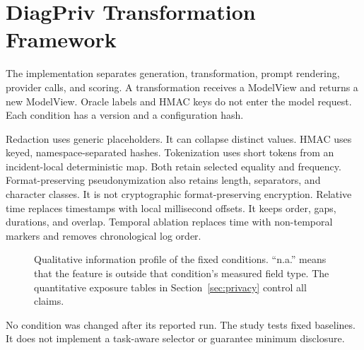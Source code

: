 \section{DiagPriv Transformation Framework}
\label{sec:framework}
The implementation separates generation, transformation, prompt rendering,
provider calls, and scoring. A transformation receives a ModelView and returns
a new ModelView. Oracle labels and HMAC keys do not enter the model request.
Each condition has a version and a configuration hash.

Redaction uses generic placeholders. It can collapse distinct values. HMAC
uses keyed, namespace-separated hashes. Tokenization uses short tokens from
an incident-local deterministic map. Both retain selected equality and
frequency. Format-preserving pseudonymization also retains length,
separators, and character classes. It is not cryptographic format-preserving
encryption. Relative time replaces timestamps with local millisecond offsets.
It keeps order, gaps, durations, and overlap. Temporal ablation replaces time
with non-temporal markers and removes chronological log order.

\begin{figure}[H]
\centering
{}
\caption{Qualitative information profile of the fixed conditions. ``n.a.'' means
that the feature is outside that condition's measured field type. The
quantitative exposure tables in Section~\ref{sec:privacy} control all claims.}
\label{fig:transform-profile}
\end{figure}

No condition was changed after its reported run. The study tests fixed
baselines. It does not implement a task-aware selector or guarantee minimum
disclosure.
